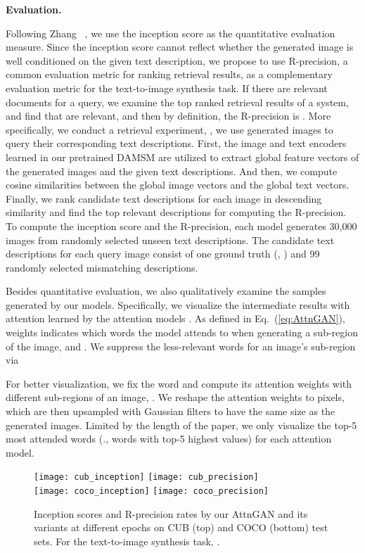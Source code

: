 \documentclass[10pt,twocolumn,letterpaper]{article}
\begin{document}
\textbf{Evaluation. }{
Following Zhang \etal~\cite{Han16stackgan}, we use the inception score \cite{Salimans2016} as the quantitative evaluation measure. Since the inception score cannot reflect whether the generated image is well conditioned on the given text description, we propose to use R-precision, a common evaluation metric for ranking retrieval results, as a complementary evaluation metric for the text-to-image synthesis task. If there are  relevant documents for a query, we examine the top  ranked retrieval results of a system, and find that  are relevant, and then by definition, the R-precision is . More specifically, we conduct a retrieval experiment, \ie, we use generated images to query their corresponding text descriptions. First, the image and text encoders learned in our pretrained DAMSM are utilized to extract global feature vectors of the generated images and the given text descriptions. And then, we compute cosine similarities between the global image vectors and the global text vectors. Finally, we rank candidate text descriptions for each image in descending similarity and find the top  relevant descriptions for computing the R-precision. To compute the inception score and the R-precision, each model generates 30,000 images from randomly selected unseen text descriptions. The candidate text descriptions for each query image consist of one ground truth (\ie, ) and 99 randomly selected mismatching descriptions. 


Besides quantitative evaluation, we also qualitatively examine the samples generated by our models.  Specifically, we visualize the intermediate results with attention learned by the attention models . As defined in Eq.~(\ref{eq:AttnGAN}), weights  indicates which words the model attends to when generating a sub-region of the image, and . 
We suppress the less-relevant words for an image's sub-region via

For better visualization, we fix the word and compute its attention weights with  different sub-regions of an image, . We reshape the  attention weights to  pixels, which are then upsampled with Gaussian filters to have the same size as the generated images. Limited by the length of the paper, we only visualize the top-5 most attended words (\ie., words with top-5 highest  values) for each attention model. 
}


\begin{figure}[bt]
\begin{center}
	\texttt{[image: cub\_inception]}
	\texttt{[image: cub\_precision]} \\ \vspace{+5pt}
	\texttt{[image: coco\_inception]}
	\texttt{[image: coco\_precision]}
\end{center}
\vspace{-8pt}
   \caption{Inception scores and R-precision rates by our AttnGAN and its variants at different epochs on CUB (top) and COCO (bottom) test sets. For the text-to-image synthesis task, .}
\label{fig:component}
\end{figure}
\end{document}
